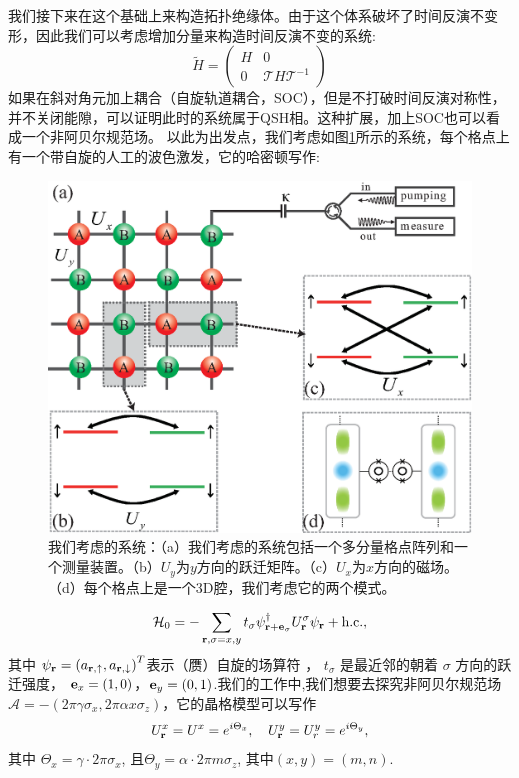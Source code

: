 \documentclass[supercite]{HustGraduPaper}
\begin{document}
我们接下来在这个基础上来构造拓扑绝缘体。由于这个体系破坏了时间反演不变形，因此我们可以考虑增加分量来构造时间反演不变的系统\cite{Wu2013,Wu2015}:
\begin{equation}
\tilde{H} = \left(\begin{array}{cc}
H &0  \\ 
0& \mathcal{T}H\mathcal{T}^{-1}
\end{array} \right)
\end{equation}
如果在斜对角元加上耦合（自旋轨道耦合，SOC），但是不打破时间反演对称性，并不关闭能隙，可以证明此时的系统属于QSH相。这种扩展，加上SOC也可以看成一个非阿贝尔规范场。
以此为出发点，我们考虑如图\ref{fig:fig1}所示的系统，每个格点上有一个带自旋的人工的波色激发，它的哈密顿写作:
   
\begin{figure}
	\centering
	\includegraphics[width=1\linewidth]{Figures/topoinsu/fig1}
	\caption{我们考虑的系统：（a）我们考虑的系统包括一个多分量格点阵列和一个测量装置。（b）$U_y$为$y$方向的跃迁矩阵。（c）$U_x$为$x$方向的磁场。（d）每个格点上是一个3D腔，我们考虑它的两个模式。}
	\label{fig:fig1}
\end{figure}

\begin{equation}
{\mathcal{H}_0} =  - \sum\limits_{{\bf r}, \sigma = x, y} t_\sigma \psi _{{\bf r} + {\bf e}_\sigma }^\dag U_{{\bf r}}^\sigma {\psi _{{\bf r}}} + \text{h.c.}, 
\label{Eq:main_h}
\end{equation}
其中 ${\psi _{\bf r}} = {\left( {{a_{{\bf r}, \uparrow }}, {a_{{\bf r}, \downarrow}}} \right)^T}$表示（赝）自旋的场算符 ， $t_\sigma$ 是最近邻的朝着 $\sigma$ 方向的跃迁强度， ${\bf e}_x = (1,0)$，${\bf e}_y = (0,1)$.我们的工作中,我们想要去探究非阿贝尔规范场$\mathcal{A} = - (2\pi \gamma \sigma_x, 2\pi \alpha x \sigma_z)$，它的晶格模型可以写作
\begin{equation}
\label{eq:hopping}
U_{{\bf r}}^x= U^x = {e^{i{\Theta _x}}}, \quad U_{{\bf r}}^y=U^y_r=e^{i{\Theta _y}},
\end{equation}
其中 ${\Theta _x} = \gamma  \cdot 2\pi {\sigma _x}$, 且${\Theta _y} = \alpha  \cdot 2\pi m{\sigma _z}$, 其中$(x,y)= (m,n)$.
\end{document}
